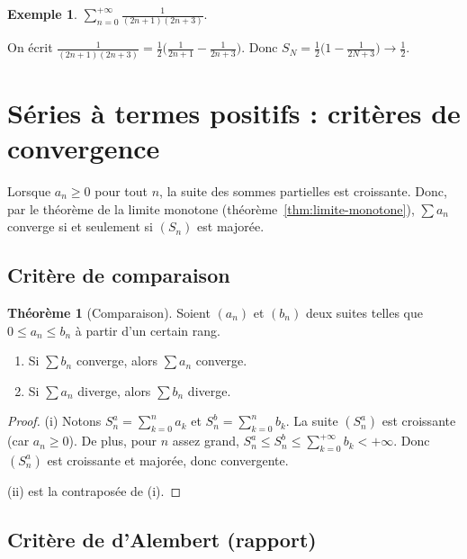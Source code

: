 \documentclass[12pt,a4paper,openany]{book}
\theoremstyle{definition}
\newtheorem{theoreme}{Théorème}[chapter]
\newtheorem{exemple}{Exemple}[chapter]
\begin{document}
\begin{exemple}\label{ex:telescopique-2}
  $\displaystyle\sum_{n=0}^{+\infty} \frac{1}{(2n+1)(2n+3)}$.

  On écrit $\frac{1}{(2n+1)(2n+3)} = \frac{1}{2}\bigl(\frac{1}{2n+1} - \frac{1}{2n+3}\bigr)$.
  Donc $S_N = \frac{1}{2}\bigl(1 - \frac{1}{2N+3}\bigr) \to \frac{1}{2}$.
\end{exemple}

\section{Séries à termes positifs : critères de convergence}\label{sec:series:termes-positifs}

Lorsque $a_n \geq 0$ pour tout $n$, la suite des sommes partielles est croissante.
Donc, par le théorème de la limite monotone (théorème~\ref{thm:limite-monotone}),
$\sum a_n$ converge si et seulement si $(S_n)$ est majorée.

\subsection{Critère de comparaison}

\begin{theoreme}[Comparaison]\label{thm:comparaison}
  Soient $(a_n)$ et $(b_n)$ deux suites telles que $0 \leq a_n \leq b_n$ à partir
  d'un certain rang.
  \begin{enumerate}[label=(\roman*)]
    \item Si $\sum b_n$ converge, alors $\sum a_n$ converge.
    \item Si $\sum a_n$ diverge, alors $\sum b_n$ diverge.
  \end{enumerate}
\end{theoreme}

\begin{proof}
  (i) Notons $S_n^a = \sum_{k=0}^{n} a_k$ et $S_n^b = \sum_{k=0}^{n} b_k$.
  La suite $(S_n^a)$ est croissante (car $a_n \geq 0$). De plus, pour $n$ assez grand,
  $S_n^a \leq S_n^b \leq \sum_{k=0}^{+\infty} b_k < +\infty$.
  Donc $(S_n^a)$ est croissante et majorée, donc convergente.

  (ii) est la contraposée de (i).
\end{proof}

\subsection{Critère de d'Alembert (rapport)}
\end{document}
